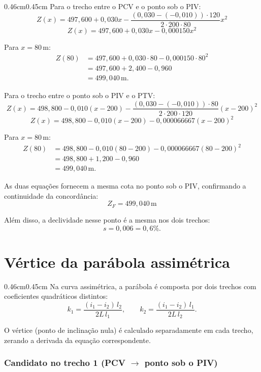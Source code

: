 \documentclass[12pt,letterpaper]{article}
\newenvironment{corpo}{\begin{adjustwidth}{0.46cm}{0.45cm}\justifying}{\end{adjustwidth}}
\begin{document}
\begin{corpo}
Para o trecho entre o PCV e o ponto sob o PIV:
\[
 Z(x)=497{,}600+0{,}030x-\frac{(0{,}030-(-0{,}010))\cdot 120}{2\cdot 200\cdot 80}x^2
\]
\[
 Z(x)=497{,}600+0{,}030x-0{,}000150x^2
\]

Para $x=80\,\text{m}$:
\[
\begin{aligned}
Z(80)&=497{,}600+0{,}030\cdot 80-0{,}000150\cdot 80^2 \\
&=497{,}600+2{,}400-0{,}960 \\
&=499{,}040\,\text{m}.
\end{aligned}
\]

Para o trecho entre o ponto sob o PIV e o PTV:
\[
 Z(x)=498{,}800-0{,}010(x-200)-\frac{(0{,}030-(-0{,}010))\cdot 80}{2\cdot 200\cdot 120}(x-200)^2
\]
\[
 Z(x)=498{,}800-0{,}010(x-200)-0{,}000066667(x-200)^2
\]

Para $x=80\,\text{m}$:
\[
\begin{aligned}
Z(80)&=498{,}800-0{,}010(80-200)-0{,}000066667(80-200)^2 \\
&=498{,}800+1{,}200-0{,}960 \\
&=499{,}040\,\text{m}.
\end{aligned}
\]

As duas equações fornecem a mesma cota no ponto sob o PIV, confirmando a continuidade da concordância:
\[
 Z_F=499{,}040\,\text{m}
\]

Além disso, a declividade nesse ponto é a mesma nos dois trechos:
\[
 s=0{,}006=0{,}6\%.
\]
\end{corpo}

\section*{Vértice da parábola assimétrica}

\begin{corpo}
Na curva assimétrica, a parábola é composta por dois trechos com coeficientes quadráticos distintos:
\[
 k_1 = \frac{(i_1-i_2)\,l_2}{2L\,l_1}, \qquad k_2 = \frac{(i_1-i_2)\,l_1}{2L\,l_2}.
\]

O vértice (ponto de inclinação nula) é calculado separadamente em cada trecho, zerando a derivada da equação correspondente.
\end{corpo}

\subsubsection*{Candidato no trecho 1 (PCV $\to$ ponto sob o PIV)}
\end{document}
